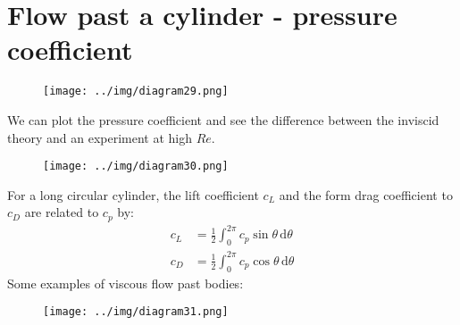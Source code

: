 \documentclass[class=report, crop=false, 12pt,a4paper]{standalone}
\begin{document}
\section{Flow past a cylinder - pressure coefficient}
\begin{figure}[H]
  \centering
  \texttt{[image: ../img/diagram29.png]}
\end{figure}
We can plot the pressure coefficient and see the difference between the inviscid theory and an experiment at high $Re$.
\begin{figure}[H]
  \centering
  \texttt{[image: ../img/diagram30.png]}
\end{figure}
For a long circular cylinder, the lift coefficient $c_L$ and the form drag coefficient to $c_D$ are related to $c_p$ by:
\begin{align}
  c_L &= \frac{1}{2} \int_{0}^{2\pi} c_p \sin{\theta} \,\mathrm{d}\theta \\
  c_D &= \frac{1}{2} \int_{0}^{2\pi} c_p \cos{\theta} \,\mathrm{d}\theta 
\end{align}
Some examples of viscous flow past bodies:
\begin{figure}[H]
  \centering
  \texttt{[image: ../img/diagram31.png]}
\end{figure}
\end{document}
